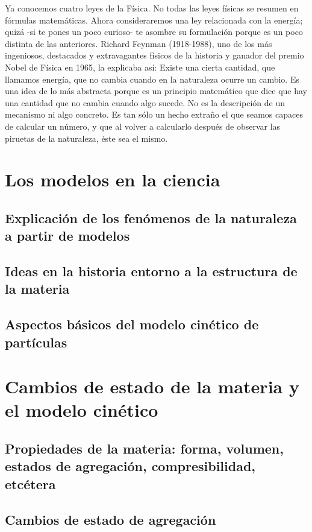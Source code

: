 \documentclass[11pt]{book}
\begin{document}
Ya conocemos cuatro leyes de la F\'isica. No todas las leyes f\'isicas
se resumen en f\'ormulas matem\'aticas. Ahora consideraremos una ley
relacionada con la energ\'ia; quiz\'a -si te pones un poco curioso- te
asombre su formulaci\'on porque es un poco distinta de las anteriores.
Richard Feynman (1918-1988), uno de los m\'as ingeniosos, destacados
y extravagantes f\'isicos de la historia y ganador del premio Nobel de
F\'isica en 1965, la explicaba as\'i:
Existe una cierta cantidad, que llamamos energ\'ia, que no cambia
cuando en la naturaleza ocurre un cambio. Es una idea de lo m\'as abstracta
porque es un principio matem\'atico que dice que hay una cantidad que no cambia
cuando algo sucede. No es la descripci\'on de un
mecanismo ni algo concreto. Es tan s\'olo un hecho extraño el que seamos capaces
de calcular un n\'umero, y que al volver a calcularlo despu\'es de observar las
piruetas de la naturaleza, \'este sea el mismo.
\section{Los modelos en la ciencia}
\subsection{Explicaci\'on de los fen\'omenos de la naturaleza a partir de modelos}
\subsection{Ideas en la historia entorno a la estructura de la materia}
\subsection{Aspectos b\'asicos del modelo cin\'etico de part\'iculas}

\section{Cambios de estado de la materia y el modelo cin\'etico}
\subsection{Propiedades de la materia: forma, volumen, estados de agregaci\'on, compresibilidad, etc\'etera}
\subsection{Cambios de estado de agregaci\'on}
\end{document}
